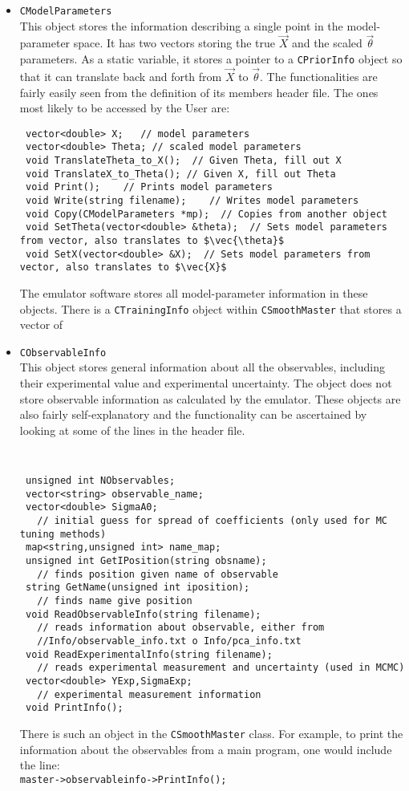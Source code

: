 \documentclass[UserManual.tex]{subfiles}
\begin{document}
\begin{itemize}
\item {\tt CModelParameters}\\
This object stores the information describing a single point in the model-parameter space. It has two vectors storing the true $\vec{X}$ and the scaled $\vec{\theta}$ parameters. As a static variable, it stores a pointer to a {\tt CPriorInfo} object so that it can translate back and forth from $\vec{X}$ to $\vec{\theta}$. The functionalities are fairly easily seen from the definition of its members header file. The ones most likely to be accessed by the User are:
{\tt\begin{verbatim}
 vector<double> X;   // model parameters
 vector<double> Theta; // scaled model parameters
 void TranslateTheta_to_X();  // Given Theta, fill out X
 void TranslateX_to_Theta(); // Given X, fill out Theta
 void Print();    // Prints model parameters
 void Write(string filename);    // Writes model parameters
 void Copy(CModelParameters *mp);  // Copies from another object
 void SetTheta(vector<double> &theta);  // Sets model parameters from vector, also translates to $\vec{\theta}$
 void SetX(vector<double> &X);  // Sets model parameters from vector, also translates to $\vec{X}$
\end{verbatim}}
The emulator software stores all model-parameter information in these objects. There is a {\tt CTrainingInfo} object within {\tt CSmoothMaster} that stores a vector of 

\item {\tt CObservableInfo}\\
This object stores general information about all the observables, including their experimental value and experimental uncertainty. The object does not store observable information as calculated by the emulator. These objects are also fairly self-explanatory and the functionality can be ascertained by looking at some of the lines in the header file. 
{\tt
\begin{verbatim}
 unsigned int NObservables;
 vector<string> observable_name;
 vector<double> SigmaA0;
   // initial guess for spread of coefficients (only used for MC tuning methods)
 map<string,unsigned int> name_map;
 unsigned int GetIPosition(string obsname);
   // finds position given name of observable
 string GetName(unsigned int iposition);
   // finds name give position
 void ReadObservableInfo(string filename);
   // reads information about observable, either from
   //Info/observable_info.txt o Info/pca_info.txt 
 void ReadExperimentalInfo(string filename);
   // reads experimental measurement and uncertainty (used in MCMC)
 vector<double> YExp,SigmaExp;
   // experimental measurement information
 void PrintInfo();
\end{verbatim}}

There is such an object in the {\tt CSmoothMaster} class. For example, to print the information about the observables from a main program, one would include the line:\\
 {\tt master->observableinfo->PrintInfo();}


\end{itemize}
\end{document}
